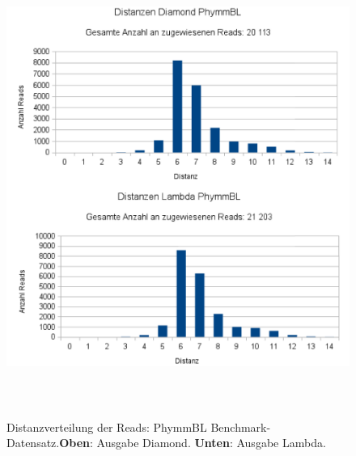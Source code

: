 \documentclass[10pt, a4paper]{report}[08.12.2015]
\begin{document}
     \begin{figure}[H]
      \centering
      \noindent\includegraphics[width=\linewidth,height=15cm,
      keepaspectratio]{Abbildungen/PhymmBL_Distanzen_both.png}
      \caption[Distanzverteilung der Reads: PhymmBL Benchmark-Datensatz.]{\small{Distanzverteilung der Reads: PhymmBL Benchmark-Datensatz.\newline \textbf{Oben}: Ausgabe Diamond. \textbf{Unten}: Ausgabe Lambda.}}
      \label{fig:phymmbl}
    \end{figure}
    
\end{document}
